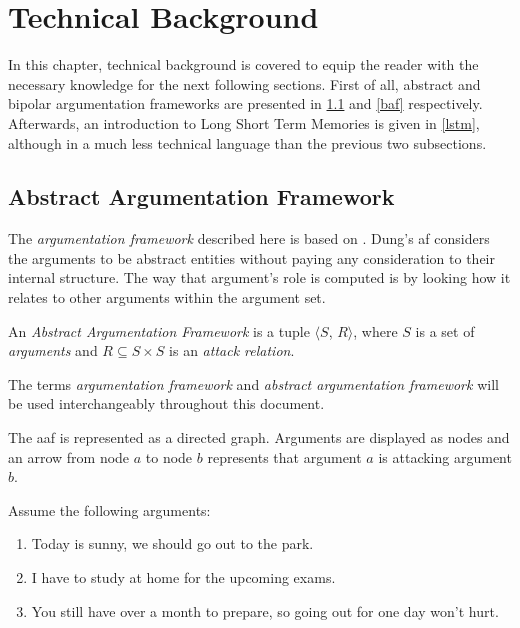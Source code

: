 \section{Technical Background} \label{techbackground}
    In this chapter, technical background is covered to equip the reader with the necessary knowledge for the next following sections. First of all, abstract and bipolar argumentation frameworks are presented in \cref{aaf} and \cref{baf} respectively. Afterwards, an introduction to Long Short Term Memories is given in \cref{lstm}, although in a much less technical language than the previous two subsections.

    \subsection{Abstract Argumentation Framework} \label{aaf}
        The \textit{argumentation framework} described here is based on \autocite{Dung1995OnTA}. Dung's \gls{af} considers the arguments to be abstract entities without paying any consideration to their internal structure. The way that argument's role is computed is by looking how it relates to other arguments within the argument set.
        
        \begin{definition}
            An \textit{Abstract Argumentation Framework} is a tuple $\langle S$, $R \rangle$, where $S$ is a set of \textit{arguments} and $R \subseteq S \times S$ is an \textit{attack relation}.
            \label{definition:definition1}
        \end{definition}
        
        \begin{remark}
            The terms \textit{argumentation framework} and \textit{abstract argumentation framework} will be used interchangeably throughout this document.
            \label{remark:remark1}
        \end{remark}
        
        The \gls{aaf} is represented as a directed graph. Arguments are displayed as nodes and an arrow from node $a$ to node $b$ represents that argument $a$ is attacking argument $b$.
        \begin{exa}
            Assume the following arguments:
            \begin{enumerate}[label=\alph* -]
                \item Today is sunny, we should go out to the park.
                \item I have to study at home for the upcoming exams.
                \item You still have over a month to prepare, so going out for one day won't hurt.
            \end{enumerate}
            \label{exa:example1}
        \end{exa}
        
